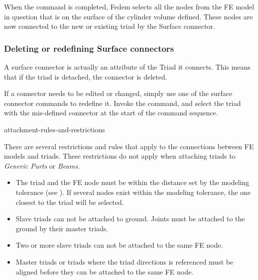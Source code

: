 When the command is completed, Fedem selects all the nodes from the FE model in
question that is on the surface of the cylinder volume defined. These nodes
are now connected to the new or existing triad by the Surface connector.

\subsubsection{Deleting or redefining Surface connectors}

A surface connector is actually an attribute of the Triad it connects.
This means that if the triad is detached, the connector is deleted.

If a connector needs to be edited or changed, simply use one of the surface
connector commands to redefine it. Invoke the command, and select the triad with
the mis-defined connector at the start of the command sequence.


           {attachment-rules-and-restrictions}

There are several restrictions and rules that apply to the connections between
FE models and triads. These restrictions do not apply when attaching triads to
{\sl Generic Parts} or {\sl Beams.}

\begin{itemize}
\item
  The triad and the FE node must be within the distance set by the modeling
  tolerance (see ).
  If several nodes exist within the modeling tolerance,
  the one closest to the triad will be selected.
\item
  Slave triads can not be attached to ground.
  Joints must be attached to the ground by their master triads.
\item
  Two or more slave triads can not be attached to the same FE node.
\item
  Master triads or triads where the triad directions is referenced must
  be aligned before they can be attached to the same FE node.
\end{itemize}




